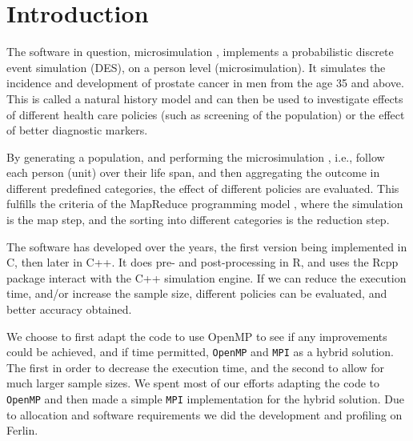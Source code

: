 \section{Introduction}

The software in question, microsimulation \cite{microsimulation},
implements a probabilistic discrete event simulation (DES), on a
person level (microsimulation). It simulates the incidence and development of prostate cancer
in men from the age 35 and above. This is called a natural history
model and can then be used to investigate effects of different health
care policies (such as screening of the population) or the effect of
better diagnostic markers.

By generating a population, and performing the microsimulation \citep{gulati_calibrating_2010},
i.e., follow each person (unit) over their life span, and then
aggregating the outcome in different predefined categories, the effect of
different policies are evaluated. This fulfills the criteria of the
MapReduce programming model \cite{MapReduce:2004}, where the
simulation is the map step, and the sorting into different categories
is the reduction step.

The software has developed over the years, the first version being
implemented in C, then later in C++. It does pre- and post-processing
in R, and uses the Rcpp \citep{rcpp} package interact with the C++
simulation engine. If we can reduce the execution time, and/or
increase the sample size, different policies can be evaluated, and
better accuracy obtained.

We choose to first adapt the code to use OpenMP to see if any
improvements could be achieved, and if time permitted, \texttt{OpenMP}
and \texttt{MPI} as a hybrid solution. The first in order to decrease
the execution time, and the second to allow for much larger sample
sizes. We spent most of our efforts adapting the code to
\texttt{OpenMP} and then made a simple \texttt{MPI} implementation for
the hybrid solution. Due to allocation and software requirements we
did the development and profiling on Ferlin.







